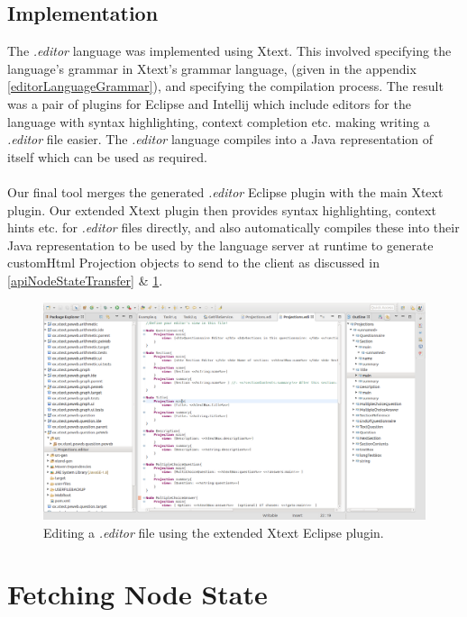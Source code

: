 \documentclass{article}
\begin{document}
{\subsection{Implementation}
The \emph{.editor} language was implemented using Xtext. This involved specifying the language's grammar in Xtext's grammar language, (given in the appendix \ref{editorLanguageGrammar}), and specifying the compilation process. The result was a pair of plugins for Eclipse and Intellij which include editors for the language with syntax highlighting, context completion etc. making writing a \emph{.editor} file easier. The \emph{.editor} language compiles into a Java representation of itself which can be used as required.
\\
\\
Our final tool merges the generated \emph{.editor} Eclipse plugin with the main Xtext plugin. Our extended Xtext plugin then provides syntax highlighting, context hints etc. for \emph{.editor} files directly, and also automatically compiles these into their Java representation to be used by the language server at runtime to generate customHtml Projection objects to send to the client as discussed in \ref{apiNodeStateTransfer} \& \ref{viewObject}.

\begin{figure}[h!]
  \centering
  \includegraphics[width=\linewidth]{./Screenshots/EditorLanguagePluginScreenshot.png}
  \caption{Editing a \emph{.editor} file using the extended Xtext Eclipse plugin.}
  \label{fig:editorEditor}
\end{figure}

\section{Fetching Node State}\label{viewObject}

}
\end{document}
